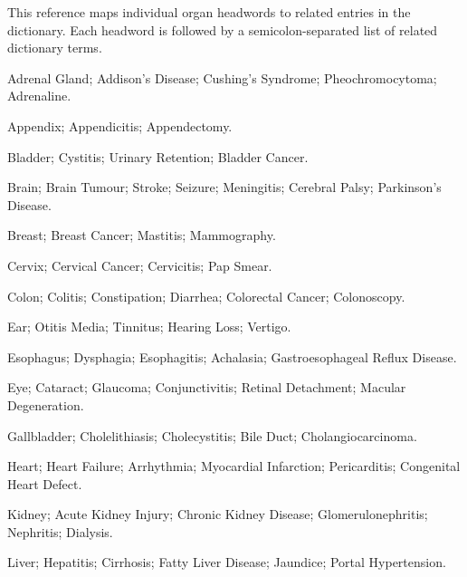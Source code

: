 This reference maps individual organ headwords to related entries in the dictionary. Each headword is followed by a semicolon-separated list of related dictionary terms.

\small
\begin{description}[style=nextline,leftmargin=0pt,labelwidth=0pt,labelindent=0pt]
\item[Adrenal Gland]
Adrenal Gland; Addison's Disease; Cushing's Syndrome; Pheochromocytoma; Adrenaline.

\item[Appendix]
Appendix; Appendicitis; Appendectomy.

\item[Bladder]
Bladder; Cystitis; Urinary Retention; Bladder Cancer.

\item[Brain]
Brain; Brain Tumour; Stroke; Seizure; Meningitis; Cerebral Palsy; Parkinson's Disease.

\item[Breast]
Breast; Breast Cancer; Mastitis; Mammography.

\item[Cervix]
Cervix; Cervical Cancer; Cervicitis; Pap Smear.

\item[Colon]
Colon; Colitis; Constipation; Diarrhea; Colorectal Cancer; Colonoscopy.

\item[Ear]
Ear; Otitis Media; Tinnitus; Hearing Loss; Vertigo.

\item[Esophagus]
Esophagus; Dysphagia; Esophagitis; Achalasia; Gastroesophageal Reflux Disease.

\item[Eye]
Eye; Cataract; Glaucoma; Conjunctivitis; Retinal Detachment; Macular Degeneration.

\item[Gallbladder]
Gallbladder; Cholelithiasis; Cholecystitis; Bile Duct; Cholangiocarcinoma.

\item[Heart]
Heart; Heart Failure; Arrhythmia; Myocardial Infarction; Pericarditis; Congenital Heart Defect.

\item[Kidney]
Kidney; Acute Kidney Injury; Chronic Kidney Disease; Glomerulonephritis; Nephritis; Dialysis.

\item[Liver]
Liver; Hepatitis; Cirrhosis; Fatty Liver Disease; Jaundice; Portal Hypertension.


\end{description}
